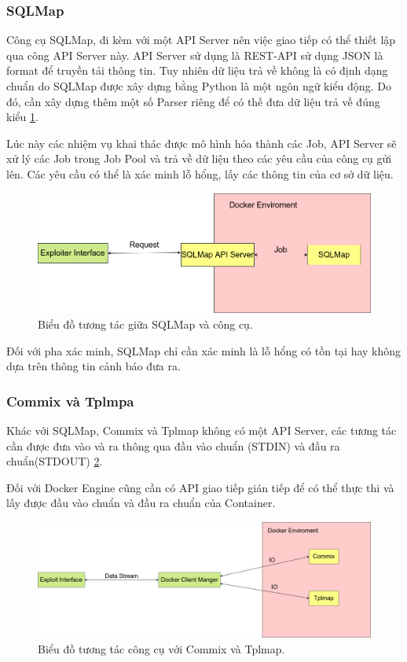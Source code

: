 \documentclass[./../main.tex]{subfiles}
\begin{document}
\subsubsection{SQLMap}
Công cụ SQLMap, đi kèm với một API Server nên việc giao tiếp có thể thiết
lập qua công API Server này. API Server sử dụng là REST-API sử dụng JSON
là format để truyền tải thông tin. Tuy nhiên dữ liệu trả về không là có
định dạng chuẩn do SQLMap được xây dựng bằng Python là một ngôn ngữ kiểu
động. Do đó, cần xây dựng thêm một số Parser riêng để có thế đưa dữ liệu
trả về đúng kiểu \ref{fig:sqlmap}.

Lúc này các nhiệm vụ khai thác được mô hình hóa thành các Job, API Server
sẽ xử lý các Job trong Job Pool và trả về dữ liệu theo các yêu cầu của công
cụ gửi lên. Các yêu cầu có thể là xác minh lỗ hổng, lấy các thông tin của
cơ sở dữ liệu.


\begin{figure}[h!]
	\includegraphics[width=\linewidth]{./images/SQLMap.png}
	\caption{Biểu đồ tương tác giữa SQLMap và công cụ.}
	\label{fig:sqlmap}
\end{figure}

Đối với pha xác minh, SQLMap chỉ cần xác minh là lỗ hổng có tồn tại
hay không dựa trên thông tin cảnh báo đưa ra.
\subsubsection{Commix và Tplmpa}
Khác với SQLMap, Commix và Tplmap không có một API Server, các tương
tác cần được đưa vào và ra thông qua đầu vào chuẩn (STDIN) và đầu ra
chuẩn(STDOUT) \ref{fig:commix_tplmap}.

Đối với Docker Engine cũng cần có API giao tiếp gián tiếp để có thể thực
thi và lấy được đầu vào chuẩn và đầu ra chuẩn của Container.


\begin{figure}[h!]
	\includegraphics[width=\linewidth]{./images/DockerIO.png}
	\caption{Biểu đồ tương tác công cụ với Commix và Tplmap.}
	\label{fig:commix_tplmap}
\end{figure}
\end{document}
